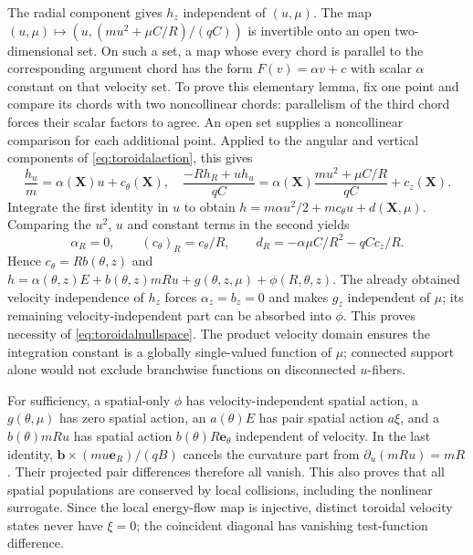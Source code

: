 \documentclass[11pt,letterpaper]{article}
\newcommand{\X}{\mathbf X}
\begin{document}
The radial component gives $h_z$ independent of $(u,\mu)$.
The map $(u,\mu)\mapsto(u,(m u^2+\mu C/R)/(qC))$ is invertible onto an open
two-dimensional set. On such a set, a map whose every chord is parallel to the
corresponding argument chord has the form $F(v)=\alpha v+c$ with scalar
$\alpha$ constant on that velocity set. To prove this elementary lemma, fix one
point and compare its chords with two noncollinear chords: parallelism of the
third chord forces their scalar factors to agree. An open set supplies a
noncollinear comparison for each additional point.
Applied to the angular and vertical components of \eqref{eq:toroidalaction},
this gives
\begin{equation}
 \frac{h_u}{m}=\alpha(\X)u+c_\theta(\X),\quad
 \frac{-R h_R+u h_u}{qC}
 =\alpha(\X)\frac{m u^2+\mu C/R}{qC}+c_z(\X).
\end{equation}
Integrate the first identity in $u$ to obtain
$h=m\alpha u^2/2+m c_\theta u+d(\X,\mu)$.
Comparing the $u^2$, $u$ and constant terms in the second yields
\begin{equation}
 \alpha_R=0,\qquad (c_\theta)_R=c_\theta/R,\qquad
 d_R=-\alpha\mu C/R^2-qC c_z/R.
\end{equation}
Hence $c_\theta=R b(\theta,z)$ and
$h=\alpha(\theta,z)E+b(\theta,z)mRu+
 g(\theta,z,\mu)+\phi(R,\theta,z)$.
The already obtained velocity independence of $h_z$ forces
$\alpha_z=b_z=0$ and makes $g_z$ independent of $\mu$; its remaining
velocity-independent part can be absorbed into $\phi$.
This proves necessity of \eqref{eq:toroidalnullspace}.
The product velocity domain ensures the integration constant is a globally
single-valued function of $\mu$; connected support alone would not exclude
branchwise functions on disconnected $u$-fibers.

For sufficiency, a spatial-only $\phi$ has velocity-independent spatial action,
a $g(\theta,\mu)$ has zero spatial action, an $a(\theta)E$ has pair spatial
action $a\xi$, and a $b(\theta)mRu$ has spatial action
$b(\theta)R\bm e_\theta$ independent of velocity. In the last identity,
$\bm b\times(m u\bm e_R)/(qB)$ cancels the curvature part from
$\partial_u(mRu)=mR$. Their projected pair differences therefore all vanish.
This also proves that all spatial populations are conserved by local
collisions, including the nonlinear surrogate. Since the local energy-flow
map is injective, distinct toroidal velocity states never have $\xi=0$;
the coincident diagonal has vanishing test-function difference.
\end{document}
